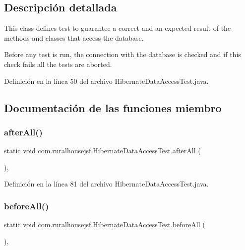 \subsection{Descripción detallada}
This class defines test to guarantee a correct and an expected result of the methods and classes that access the database. 

Before any test is run, the connection with the database is checked and if this check fails all the tests are aborted. 

Definición en la línea 50 del archivo Hibernate\+Data\+Access\+Test.\+java.



\subsection{Documentación de las funciones miembro}
\mbox{\label{classcom_1_1ruralhousejsf_1_1_hibernate_data_access_test_ad178c485d2837875d915e6876d29862c}} 
\subsubsection{\texorpdfstring{afterAll()}{afterAll()}}
{\footnotesize\ttfamily static void com.\+ruralhousejsf.\+Hibernate\+Data\+Access\+Test.\+after\+All (\begin{DoxyParamCaption}{ }\end{DoxyParamCaption})\hspace{0.3cm}{\ttfamily [static]}, {\ttfamily [package]}}



Definición en la línea 81 del archivo Hibernate\+Data\+Access\+Test.\+java.

\mbox{\label{classcom_1_1ruralhousejsf_1_1_hibernate_data_access_test_a385a9a721138e301ab9b775298eff369}} 
\subsubsection{\texorpdfstring{beforeAll()}{beforeAll()}}
{\footnotesize\ttfamily static void com.\+ruralhousejsf.\+Hibernate\+Data\+Access\+Test.\+before\+All (\begin{DoxyParamCaption}{ }\end{DoxyParamCaption})\hspace{0.3cm}{\ttfamily [static]}, {\ttfamily [package]}}



